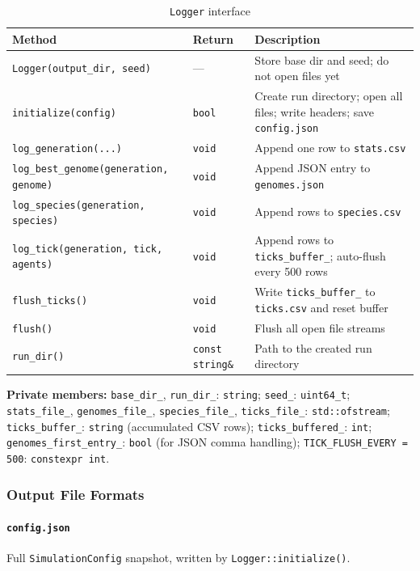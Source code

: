 \begin{table}[H]
\centering\small
\caption{\texttt{Logger} interface}
\begin{tabularx}{\textwidth}{@{}llX@{}}
\toprule
\textbf{Method} & \textbf{Return} & \textbf{Description} \\
\midrule
\texttt{Logger(output\_dir, seed)} & — & Store base dir and seed; do not open files yet \\
\texttt{initialize(config)} & \texttt{bool} & Create run directory; open all files; write headers; save \texttt{config.json} \\
\texttt{log\_generation(...)} & \texttt{void} & Append one row to \texttt{stats.csv} \\
\texttt{log\_best\_genome(generation, genome)} & \texttt{void} & Append JSON entry to \texttt{genomes.json} \\
\texttt{log\_species(generation, species)} & \texttt{void} & Append rows to \texttt{species.csv} \\
\texttt{log\_tick(generation, tick, agents)} & \texttt{void} & Append rows to \texttt{ticks\_buffer\_}; auto-flush every 500 rows \\
\texttt{flush\_ticks()} & \texttt{void} & Write \texttt{ticks\_buffer\_} to \texttt{ticks.csv} and reset buffer \\
\texttt{flush()} & \texttt{void} & Flush all open file streams \\
\texttt{run\_dir()} & \texttt{const string\&} & Path to the created run directory \\
\bottomrule
\end{tabularx}
\end{table}

\textbf{Private members:}
\texttt{base\_dir\_}, \texttt{run\_dir\_}: \texttt{string};
\texttt{seed\_}: \texttt{uint64\_t};
\texttt{stats\_file\_}, \texttt{genomes\_file\_}, \texttt{species\_file\_}, \texttt{ticks\_file\_}:
\texttt{std::ofstream};
\texttt{ticks\_buffer\_}: \texttt{string} (accumulated CSV rows);
\texttt{ticks\_buffered\_}: \texttt{int};
\texttt{genomes\_first\_entry\_}: \texttt{bool} (for JSON comma handling);
\texttt{TICK\_FLUSH\_EVERY = 500}: \texttt{constexpr int}.

\subsubsection{Output File Formats}

\paragraph{\texttt{config.json}} Full \texttt{SimulationConfig} snapshot, written by
\texttt{Logger::initialize()}.

